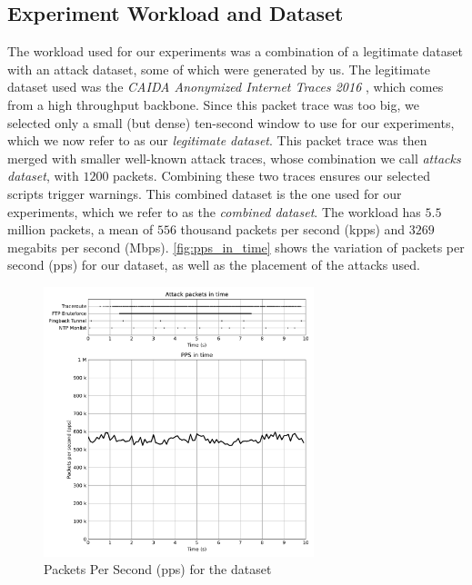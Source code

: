 \subsection{Experiment Workload and Dataset} %

The workload used for our experiments was a combination of a legitimate dataset with an attack dataset, some of which were generated by us. The legitimate dataset used was the \textit{CAIDA Anonymized Internet Traces 2016} \cite{CAIDA2016}, which comes from a high throughput backbone. Since this packet trace was too big, we selected only a small (but dense) ten-second window to use for our experiments, which we now refer to as our \textit{legitimate dataset}. This packet trace was then merged with smaller well-known attack traces, whose combination we call \textit{attacks dataset}, with $1200$ packets. Combining these two traces ensures our selected scripts trigger warnings. This combined dataset is the one used for our experiments, which we refer to as the \textit{combined dataset}. The workload has $5.5$ million packets, a mean of $556$ thousand packets per second (kpps) and $3269$ megabits per second (Mbps). \autoref{fig:pps_in_time} shows the variation of packets per second (pps) for our dataset, as well as the placement of the attacks used.

\begin{figure}[H]
    \caption{Packets Per Second (pps) for the dataset}
    \begin{center}
        \includegraphics[width=0.7\textwidth]{images/pps_in_time.pdf}  
    \end{center}
    \label{fig:pps_in_time}
\end{figure}

